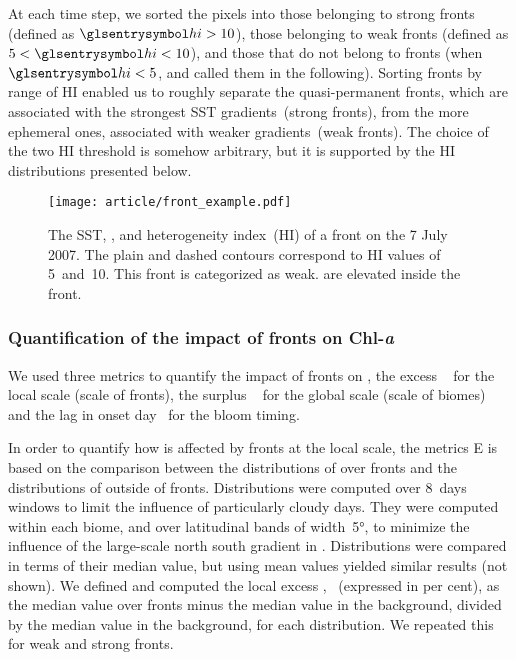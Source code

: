At each time step, we sorted the pixels into those belonging to strong fronts (defined as \(\am{hi} > 10\)), those belonging to weak fronts (defined as \(5 < \am{hi} < 10\)), and those that do not belong to fronts (when \(\am{hi} < 5\), and called them  in the following).
Sorting fronts by range of HI enabled us to roughly separate the quasi-permanent fronts, which are associated with the strongest SST gradients~(strong fronts), from the more ephemeral ones, associated with weaker gradients~(weak fronts).
The choice of the two HI threshold is somehow arbitrary, but it is supported by the HI distributions presented below.


\begin{figure}
  \centering
  \texttt{[image: article/front\_example.pdf]}
  \caption[Example of front]{
    The SST, , and heterogeneity index~(HI) of a front on the 7 July 2007.
    The plain and dashed contours correspond to HI values of 5~and~10.
    This front is categorized as weak.
     are elevated inside the front.
  }%
  \label{fig:zoom}
\end{figure}

\subsubsection{Quantification of the impact of fronts on Chl-\textit{a}}

We used three metrics to quantify the impact of fronts on , the excess ~ for the local scale (scale of fronts), the surplus ~ for the global scale (scale of biomes) and the lag in onset day~ for the bloom timing.

In order to quantify how  is affected by fronts at the local scale, the metrics E is based on the comparison between the distributions of  over fronts and the distributions of  outside of fronts.
Distributions were computed over 8~days windows to limit the influence of particularly cloudy days.
They were computed within each biome, and over latitudinal bands of width~\ang[mode=math]{5}, to minimize the influence of the large-scale north south gradient in .
Distributions were compared in terms of their median value, but using mean values yielded similar results (not shown).
We defined and computed the local excess ,~ (expressed in per cent), as the median value over fronts minus the median value in the background, divided by the median value in the background, for each distribution.
We repeated this for weak and strong fronts.

